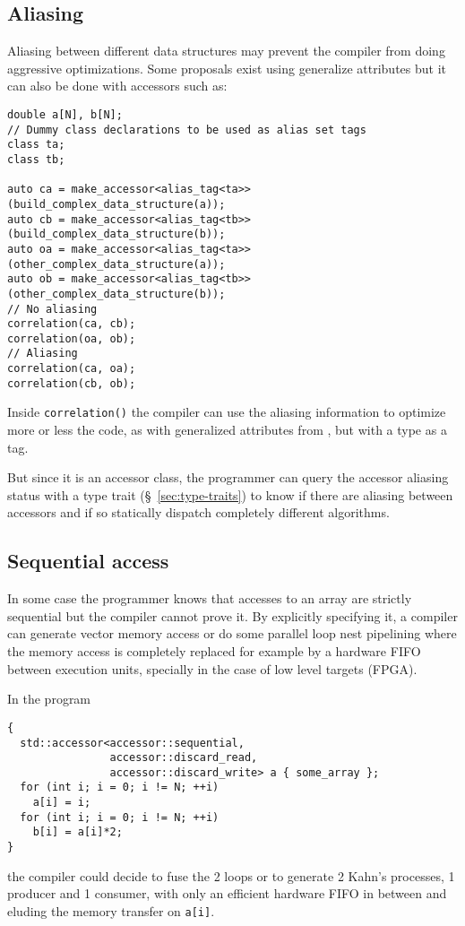 \documentclass[a4paper]{article}
\begin{document}
\subsection{Aliasing}
\label{sec:aliasing}

Aliasing between different data structures may prevent the compiler
from doing aggressive optimizations. Some proposals exist using
generalize attributes \cite{C++:N3988:aliasing} but it can also be
done with accessors such as:
\begin{lstlisting}
double a[N], b[N];
// Dummy class declarations to be used as alias set tags
class ta;
class tb;

auto ca = make_accessor<alias_tag<ta>>(build_complex_data_structure(a));
auto cb = make_accessor<alias_tag<tb>>(build_complex_data_structure(b));
auto oa = make_accessor<alias_tag<ta>>(other_complex_data_structure(a));
auto ob = make_accessor<alias_tag<tb>>(other_complex_data_structure(b));
// No aliasing
correlation(ca, cb);
correlation(oa, ob);
// Aliasing
correlation(ca, oa);
correlation(cb, ob);
\end{lstlisting}

Inside \lstinline|correlation()| the compiler can use the aliasing
information to optimize more or less the code, as with generalized
attributes from \cite{C++:N3988:aliasing}, but with a type as a tag.

But since it is an accessor class, the programmer can query the
accessor aliasing status with a type trait (\S~\ref{sec:type-traits})
to know if there are aliasing between accessors and if so statically
dispatch completely different algorithms.


\subsection{Sequential access}
\label{sec:sequential-access}

In some case the programmer knows that accesses to an array are
strictly sequential but the compiler cannot prove it. By explicitly
specifying it, a compiler can generate vector memory access or do some
parallel loop nest pipelining where the memory access is completely
replaced for example by a hardware FIFO between execution units,
specially in the case of low level targets (FPGA).

In the program
\begin{lstlisting}
{
  std::accessor<accessor::sequential,
                accessor::discard_read,
                accessor::discard_write> a { some_array };
  for (int i; i = 0; i != N; ++i)
    a[i] = i;
  for (int i; i = 0; i != N; ++i)
    b[i] = a[i]*2;
}
\end{lstlisting}
the compiler could decide to fuse the 2 loops or to generate 2 Kahn's
processes, 1 producer and 1 consumer, with only an efficient hardware
FIFO in between and eluding the memory transfer on \lstinline|a[i]|.
\end{document}
